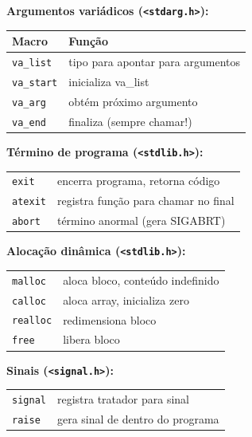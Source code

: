 \documentclass[12pt,a4paper]{article}
\begin{document}
\begin{tcolorbox}[colback=deitelgray,colframe=deitelblue,title={\bfseries Mapa de funções por categoria}]

\textbf{Argumentos variádicos (\texttt{<stdarg.h>}):}
\begin{center}
\renewcommand{\arraystretch}{1.2}
\begin{tabular}{l l}
\toprule
\textbf{Macro} & \textbf{Função} \\ \midrule
\texttt{va\_list}  & tipo para apontar para argumentos \\
\texttt{va\_start} & inicializa va\_list \\
\texttt{va\_arg}   & obtém próximo argumento \\
\texttt{va\_end}   & finaliza (sempre chamar!) \\
\bottomrule
\end{tabular}
\end{center}

\textbf{Término de programa (\texttt{<stdlib.h>}):}
\begin{center}
\begin{tabular}{l l}
\toprule
\texttt{exit}    & encerra programa, retorna código \\
\texttt{atexit}  & registra função para chamar no final \\
\texttt{abort}   & término anormal (gera SIGABRT) \\
\bottomrule
\end{tabular}
\end{center}

\textbf{Alocação dinâmica (\texttt{<stdlib.h>}):}
\begin{center}
\begin{tabular}{l l}
\toprule
\texttt{malloc}  & aloca bloco, conteúdo indefinido \\
\texttt{calloc}  & aloca array, inicializa zero \\
\texttt{realloc} & redimensiona bloco \\
\texttt{free}    & libera bloco \\
\bottomrule
\end{tabular}
\end{center}

\textbf{Sinais (\texttt{<signal.h>}):}
\begin{center}
\begin{tabular}{l l}
\toprule
\texttt{signal} & registra tratador para sinal \\
\texttt{raise}  & gera sinal de dentro do programa \\
\bottomrule
\end{tabular}
\end{center}


\end{tcolorbox}
\end{document}
